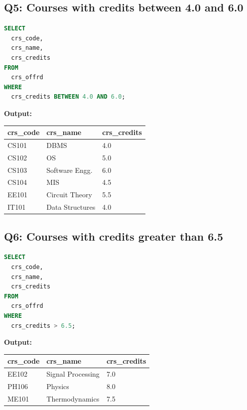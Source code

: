 \documentclass[11pt, a4paper]{article}
\begin{document}
\subsection*{Q5: Courses with credits between 4.0 and 6.0}
\begin{lstlisting}[language=SQL]
SELECT
  crs_code,
  crs_name,
  crs_credits
FROM
  crs_offrd
WHERE
  crs_credits BETWEEN 4.0 AND 6.0;
\end{lstlisting}
\vspace{0.3cm}
\textbf{Output:}\vspace{0.2cm}
\begin{center}
\begin{tabular}{|l|l|l|}
\hline
\textbf{crs\_code} & \textbf{crs\_name} & \textbf{crs\_credits} \\ \hline
CS101 & DBMS                                & 4.0 \\ \hline
CS102 & OS                                  & 5.0 \\ \hline
CS103 & Software Engg.                      & 6.0 \\ \hline
CS104 & MIS                                 & 4.5 \\ \hline
EE101 & Circuit Theory                      & 5.5 \\ \hline
IT101 & Data Structures                     & 4.0 \\ \hline
\end{tabular}
\end{center}
\newpage
\subsection*{Q6: Courses with credits greater than 6.5}
\begin{lstlisting}[language=SQL]
SELECT
  crs_code,
  crs_name,
  crs_credits
FROM
  crs_offrd
WHERE
  crs_credits > 6.5;
\end{lstlisting}
\vspace{0.3cm}
\textbf{Output:}\vspace{0.2cm}
\begin{center}
\begin{tabular}{|l|l|l|}
\hline
\textbf{crs\_code} & \textbf{crs\_name} & \textbf{crs\_credits} \\ \hline
EE102 & Signal Processing                   & 7.0 \\ \hline
PH106 & Physics                             & 8.0 \\ \hline
ME101 & Thermodynamics                      & 7.5 \\ \hline
\end{tabular}
\end{center}
\newpage
\end{document}
